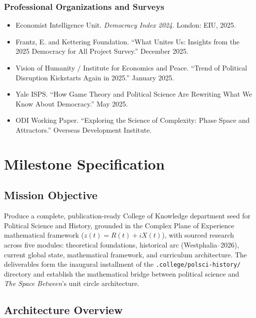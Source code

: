 \documentclass[11pt,letterpaper]{article}
\newcommand{\stageheader}[2]{%
  \noindent\colorbox{#2}{\makebox[\textwidth][l]{%
    \textcolor{white}{\bfseries\sffamily\hspace{6pt}#1\hspace{6pt}}}}%
  \vspace{0.5em}\par%
}
\begin{document}
\subsubsection{Professional Organizations and Surveys}
\begin{itemize}[noitemsep]
  \item Economist Intelligence Unit. \textit{Democracy Index 2024}. London: EIU, 2025.
  \item Frantz, E. and Kettering Foundation. ``What Unites Us: Insights from the 2025 Democracy for All Project Survey.'' December 2025.
  \item Vision of Humanity / Institute for Economics and Peace. ``Trend of Political Disruption Kickstarts Again in 2025.'' January 2025.
  \item Yale ISPS. ``How Game Theory and Political Science Are Rewriting What We Know About Democracy.'' May 2025.
  \item ODI Working Paper. ``Exploring the Science of Complexity: Phase Space and Attractors.'' Overseas Development Institute.
\end{itemize}

\newpage

\stageheader{STAGE 3 --- MISSION PACKAGE}{tertiary}

\section{Milestone Specification}

\subsection{Mission Objective}

Produce a complete, publication-ready College of Knowledge department seed for Political Science and History, grounded in the Complex Plane of Experience mathematical framework ($z(t) = R(t) + iX(t)$), with sourced research across five modules: theoretical foundations, historical arc (Westphalia--2026), current global state, mathematical framework, and curriculum architecture. The deliverables form the inaugural installment of the \texttt{.college/polsci-history/} directory and establish the mathematical bridge between political science and \textit{The Space Between}'s unit circle architecture.

\subsection{Architecture Overview}
\end{document}
